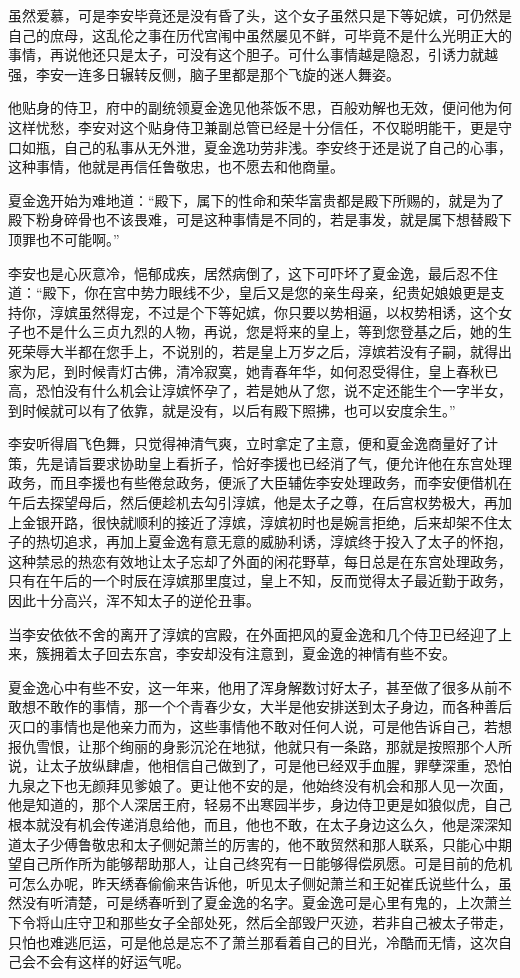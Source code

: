 虽然爱慕，可是李安毕竟还是没有昏了头，这个女子虽然只是下等妃嫔，可仍然是自己的庶母，这乱伦之事在历代宫闱中虽然屡见不鲜，可毕竟不是什么光明正大的事情，再说他还只是太子，可没有这个胆子。可什么事情越是隐忍，引诱力就越强，李安一连多日辗转反侧，脑子里都是那个飞旋的迷人舞姿。

他贴身的侍卫，府中的副统领夏金逸见他茶饭不思，百般劝解也无效，便问他为何这样忧愁，李安对这个贴身侍卫兼副总管已经是十分信任，不仅聪明能干，更是守口如瓶，自己的私事从无外泄，夏金逸功劳非浅。李安终于还是说了自己的心事，这种事情，他就是再信任鲁敬忠，也不愿去和他商量。

夏金逸开始为难地道：“殿下，属下的性命和荣华富贵都是殿下所赐的，就是为了殿下粉身碎骨也不该畏难，可是这种事情是不同的，若是事发，就是属下想替殿下顶罪也不可能啊。”

李安也是心灰意冷，悒郁成疾，居然病倒了，这下可吓坏了夏金逸，最后忍不住道：“殿下，你在宫中势力眼线不少，皇后又是您的亲生母亲，纪贵妃娘娘更是支持你，淳嫔虽然得宠，不过是个下等妃嫔，你只要以势相逼，以权势相诱，这个女子也不是什么三贞九烈的人物，再说，您是将来的皇上，等到您登基之后，她的生死荣辱大半都在您手上，不说别的，若是皇上万岁之后，淳嫔若没有子嗣，就得出家为尼，到时候青灯古佛，清冷寂寞，她青春年华，如何忍受得住，皇上春秋已高，恐怕没有什么机会让淳嫔怀孕了，若是她从了您，说不定还能生个一字半女，到时候就可以有了依靠，就是没有，以后有殿下照拂，也可以安度余生。”

李安听得眉飞色舞，只觉得神清气爽，立时拿定了主意，便和夏金逸商量好了计策，先是请旨要求协助皇上看折子，恰好李援也已经消了气，便允许他在东宫处理政务，而且李援也有些倦怠政务，便派了大臣辅佐李安处理政务，而李安便借机在午后去探望母后，然后便趁机去勾引淳嫔，他是太子之尊，在后宫权势极大，再加上金银开路，很快就顺利的接近了淳嫔，淳嫔初时也是婉言拒绝，后来却架不住太子的热切追求，再加上夏金逸有意无意的威胁利诱，淳嫔终于投入了太子的怀抱，这种禁忌的热恋有效地让太子忘却了外面的闲花野草，每日总是在东宫处理政务，只有在午后的一个时辰在淳嫔那里度过，皇上不知，反而觉得太子最近勤于政务，因此十分高兴，浑不知太子的逆伦丑事。

当李安依依不舍的离开了淳嫔的宫殿，在外面把风的夏金逸和几个侍卫已经迎了上来，簇拥着太子回去东宫，李安却没有注意到，夏金逸的神情有些不安。

夏金逸心中有些不安，这一年来，他用了浑身解数讨好太子，甚至做了很多从前不敢想不敢作的事情，那一个个青春少女，大半是他安排送到太子身边，而各种善后灭口的事情也是他亲力而为，这些事情他不敢对任何人说，可是他告诉自己，若想报仇雪恨，让那个绚丽的身影沉沦在地狱，他就只有一条路，那就是按照那个人所说，让太子放纵肆虐，他相信自己做到了，可是他已经双手血腥，罪孽深重，恐怕九泉之下也无颜拜见爹娘了。更让他不安的是，他始终没有机会和那人见一次面，他是知道的，那个人深居王府，轻易不出寒园半步，身边侍卫更是如狼似虎，自己根本就没有机会传递消息给他，而且，他也不敢，在太子身边这么久，他是深深知道太子少傅鲁敬忠和太子侧妃萧兰的厉害的，他不敢贸然和那人联系，只能心中期望自己所作所为能够帮助那人，让自己终究有一日能够得偿夙愿。可是目前的危机可怎么办呢，昨天绣春偷偷来告诉他，听见太子侧妃萧兰和王妃崔氏说些什么，虽然没有听清楚，可是绣春听到了夏金逸的名字。夏金逸可是心里有鬼的，上次萧兰下令将山庄守卫和那些女子全部处死，然后全部毁尸灭迹，若非自己被太子带走，只怕也难逃厄运，可是他总是忘不了萧兰那看着自己的目光，冷酷而无情，这次自己会不会有这样的好运气呢。

